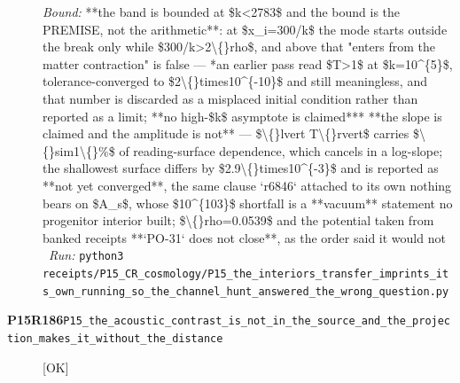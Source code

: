 \begin{description}
 \emph{Bound:}  **the band is bounded at \$k<2783\$ and the bound is the PREMISE, not the arithmetic**: at \$x\_i=300/k\$ the mode starts outside the break only while \$300/k>2\textbackslash\{\}rho\$, and above that "enters from the matter contraction" is false ---  *an earlier pass read \$T>1\$ at \$k=10\textasciicircum{}\{5\}\$, tolerance-converged to \$2\textbackslash\{\}times10\textasciicircum{}\{-10\}\$ and still meaningless, and that number is discarded as a misplaced initial condition rather than reported as a limit; **no high-\$k\$ asymptote is claimed***  **the slope is claimed and the amplitude is not** --- \$\textbackslash\{\}lvert T\textbackslash\{\}rvert\$ carries \$\textbackslash\{\}sim1\textbackslash\{\}\%\$ of reading-surface dependence, which cancels in a log-slope; the shallowest surface differs by \$2.9\textbackslash\{\}times10\textasciicircum{}\{-3\}\$ and is reported as **not yet converged**, the same clause `r6846` attached to its own  nothing bears on \$A\_s\$, whose \$10\textasciicircum{}\{103\}\$ shortfall is a **vacuum** statement  no progenitor interior built; \$\textbackslash\{\}rho=0.0539\$ and the potential taken from banked receipts  **`PO-31` does not close**, as the order said it would not
\ \emph{Run:} \texttt{python3 receipts/P15\_CR\_cosmology/P15\_the\_interiors\_transfer\_imprints\_its\_own\_running\_so\_the\_channel\_hunt\_answered\_the\_wrong\_question.py}
\item[\rcptlabel{P15_the_acoustic_contrast_is_not_in_the_source_and_the_projection_makes_it_without_the_distance}{P15R186}\textbf{P15R186}\quad\texttt{P15\_the\_acoustic\_contrast\_is\_not\_in\_the\_source\_and\_the\_projection\_makes\_it\_without\_the\_distance}]\hfill\textsf{[OK]}\\

\end{description}
